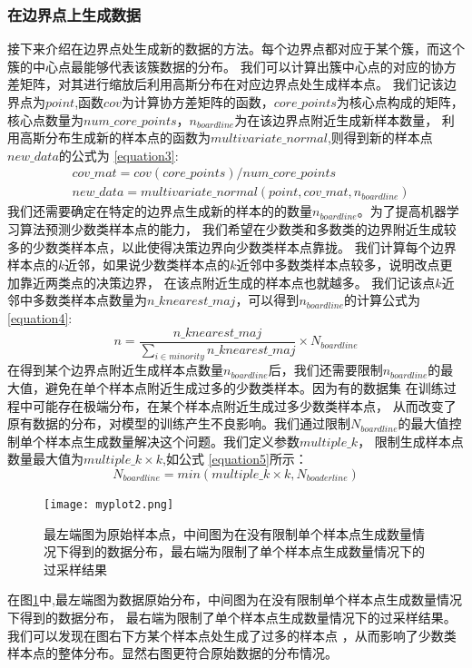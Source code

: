 \documentclass{article}
\begin{document}
\subsubsection{在边界点上生成数据}
接下来介绍在边界点处生成新的数据的方法。每个边界点都对应于某个簇，而这个簇的中心点最能够代表该簇数据的分布。
我们可以计算出簇中心点的对应的协方差矩阵，对其进行缩放后利用高斯分布在对应边界点处生成样本点。
我们记该边界点为$point$,函数$cov$为计算协方差矩阵的函数，$core\_points$为核心点构成的矩阵，核心点数量为$num\_core\_points$，$n_{boardline}$为在该边界点附近生成新样本数量，
利用高斯分布生成新的样本点的函数为$multivariate\_normal$,则得到新的样本点$new\_data$的公式为 \ref{equation3}:
\begin{equation}
  \label{equation3}
  \begin{aligned}
     & cov\_mat=cov(core\_points)/num\_core\_points \\
     & new\_data=multivariate\_normal(point,cov\_mat,n_{boardline})
  \end{aligned}
\end{equation}
我们还需要确定在特定的边界点生成新的样本的的数量$n_{boardline}$。为了提高机器学习算法预测少数类样本点的能力，
我们希望在少数类和多数类的边界附近生成较多的少数类样本点，以此使得决策边界向少数类样本点靠拢。
我们计算每个边界样本点的$k$近邻，如果说少数类样本点的$k$近邻中多数类样本点较多，说明改点更加靠近两类点的决策边界，
在该点附近生成的样本点也就越多。
我们记该点$k$近邻中多数类样本点数量为$n\_knearest\_maj$，可以得到$n_{boardline}$的计算公式为 \ref{equation4}:
\begin{equation}
  \label{equation4}
  n=\frac{n\_knearest\_maj}{\sum_{i\in minority} n\_knearest\_maj}\times N_{boardline}
\end{equation}
在得到某个边界点附近生成样本点数量$n_{boardline}$后，我们还需要限制$n_{boardline}$的最大值，避免在单个样本点附近生成过多的少数类样本。因为有的数据集
在训练过程中可能存在极端分布，在某个样本点附近生成过多少数类样本点，
从而改变了原有数据的分布，对模型的训练产生不良影响。我们通过限制$N_{boardline}$的最大值控制单个样本点生成数量解决这个问题。我们定义参数$multiple\_k$，
限制生成样本点数量最大值为$multiple\_k\times k$,如公式 \ref{equation5}所示：
\begin{equation}
  \label{equation5}
  N_{boardline}=min(multiple\_k \times k, N_{boaderline})
\end{equation}
\begin{figure}
  \centering
  \texttt{[image: myplot2.png]}
  \caption{最左端图为原始样本点，中间图为在没有限制单个样本点生成数量情况下得到的数据分布，最右端为限制了单个样本点生成数量情况下的过采样结果}
  \label{fig2}
\end{figure}
在图\ref{fig2}中,最左端图为数据原始分布，中间图为在没有限制单个样本点生成数量情况下得到的数据分布，
最右端为限制了单个样本点生成数量情况下的过采样结果。我们可以发现在图右下方某个样本点处生成了过多的样本点
，从而影响了少数类样本点的整体分布。显然右图更符合原始数据的分布情况。
\end{document}
